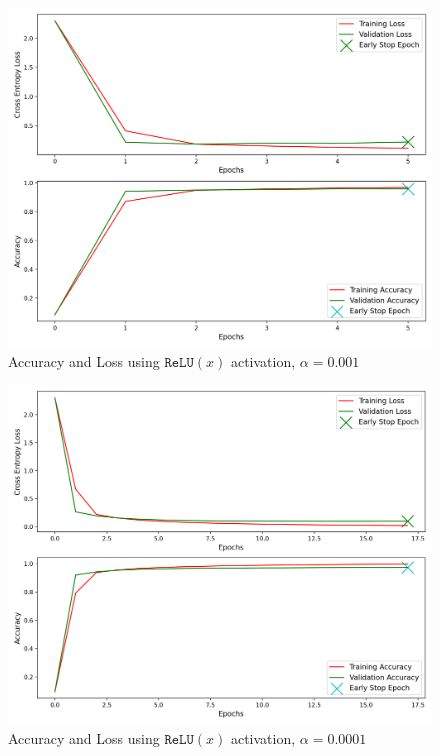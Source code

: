 \begin{figure}[h]
	\centering
	\includegraphics[width=1.0\textwidth]{./images/activation_relu.png}
	\caption{Accuracy and Loss using $\texttt{ReLU}(x)$ activation, $\alpha = 0.001$}
	\label{fig:relu}
\end{figure}

\begin{figure}[h]
	\centering
	\includegraphics[width=1.0\textwidth]{./images/activation_relu2.png}
	\caption{Accuracy and Loss using $\texttt{ReLU}(x)$ activation, $\alpha = 0.0001$}
	\label{fig:relu2}
\end{figure}

